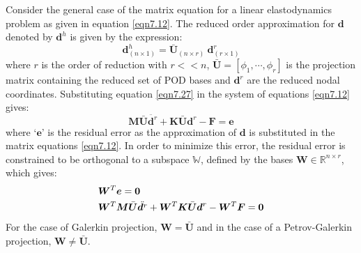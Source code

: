 \documentclass[10pt,letterpaper, onecolumn]{article}
\begin{document}
Consider the general case of the matrix equation for a linear elastodynamics problem as given in equation \eqref{eqn7.12}. The reduced order approximation for $\bm{d}$ denoted by $\bm{d}^h$ is given by the expression: 
%
\begin{equation}
\bm{d}^h_{(n \times 1)} = \bar{\bm{U}}_{(n \times r)} \  \bm{d}^r_{(r \times 1)}
\label{eqn7.27}
\end{equation}
%
where $r$ is the order of reduction with $r << n$, $\bar{\bm{U}} = [\phi_1, \cdots, \phi_r]$ is the projection matrix containing the reduced set of POD bases and $ \bm{d}^r$ are the reduced nodal coordinates. Substituting equation \eqref{eqn7.27} in the system of equations \eqref{eqn7.12} gives:
%
\begin{equation}
\bm{M} \bar{\bm{U}} \ddot{\bm{d}^r} + \bm{K} \bar{\bm{U}}  \bm{d}^r - \bm{F} = \bm{e}
\end{equation}
% 
where `$\bm{e}$' is the residual error as the approximation of $\bm{d}$ is substituted in the matrix equations \eqref{eqn7.12}. In order to minimize this error, the residual error is constrained to be orthogonal to a subspace $\mathbb{W}$, defined by the bases $\bm{W} \in \mathbb{R}^{n \times r}$, which gives:
%
\begin{align}
&\bm{W}^T \bm{e} = \bm{0} \notag \\
&\bm{W}^T\bm{M} \bar{\bm{U}} \ddot{\bm{d}^r} + \bm{W}^T\bm{K} \bar{\bm{U}}  \bm{d}^r - \bm{W}^T\bm{F} = \bm{0}
\end{align}
%
For the case of Galerkin projection, $\bm{W} = \bm{\bar{U}}$ and in the case of a Petrov-Galerkin projection, $\bm{W} \neq \bm{\bar{U}}$. 
\end{document}
